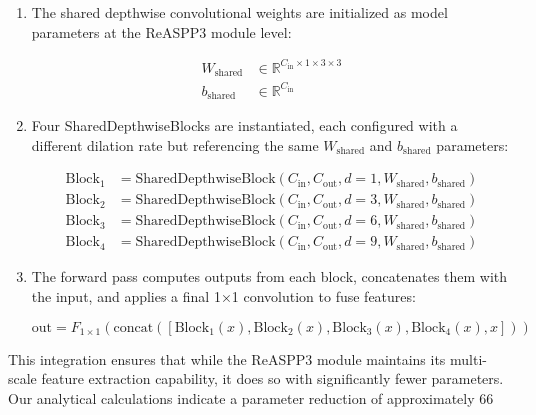 \documentclass[12pt,a4paper]{article}
\begin{document}
\begin{enumerate}
\begin{enumerate}
\item The shared depthwise convolutional weights are initialized as model parameters at the ReASPP3 module level:
   
   \begin{align}
   W_{\textrm{shared}} &\in \mathbb{R}^{C_{\textrm{in}} \times 1 \times 3 \times 3} \\
   b_{\textrm{shared}} &\in \mathbb{R}^{C_{\textrm{in}}}
   \end{align}

\item Four SharedDepthwiseBlocks are instantiated, each configured with a different dilation rate but referencing the same $W_{\textrm{shared}}$ and $b_{\textrm{shared}}$ parameters:
   
   \begin{align}
   \textrm{Block}_1 &= \textrm{SharedDepthwiseBlock}(C_{\textrm{in}}, C_{\textrm{out}}, d=1, W_{\textrm{shared}}, b_{\textrm{shared}}) \\
   \textrm{Block}_2 &= \textrm{SharedDepthwiseBlock}(C_{\textrm{in}}, C_{\textrm{out}}, d=3, W_{\textrm{shared}}, b_{\textrm{shared}}) \\
   \textrm{Block}_3 &= \textrm{SharedDepthwiseBlock}(C_{\textrm{in}}, C_{\textrm{out}}, d=6, W_{\textrm{shared}}, b_{\textrm{shared}}) \\
   \textrm{Block}_4 &= \textrm{SharedDepthwiseBlock}(C_{\textrm{in}}, C_{\textrm{out}}, d=9, W_{\textrm{shared}}, b_{\textrm{shared}})
   \end{align}

\item The forward pass computes outputs from each block, concatenates them with the input, and applies a final 1×1 convolution to fuse features:
   
   \begin{equation}
   \textrm{out} = F_{1 \times 1}(\textrm{concat}([\textrm{Block}_1(x), \textrm{Block}_2(x), \textrm{Block}_3(x), \textrm{Block}_4(x), x]))
   \end{equation}
\end{enumerate}

This integration ensures that while the ReASPP3 module maintains its multi-scale feature extraction capability, it does so with significantly fewer parameters. Our analytical calculations indicate a parameter reduction of approximately 66%


\end{enumerate}
\end{document}
